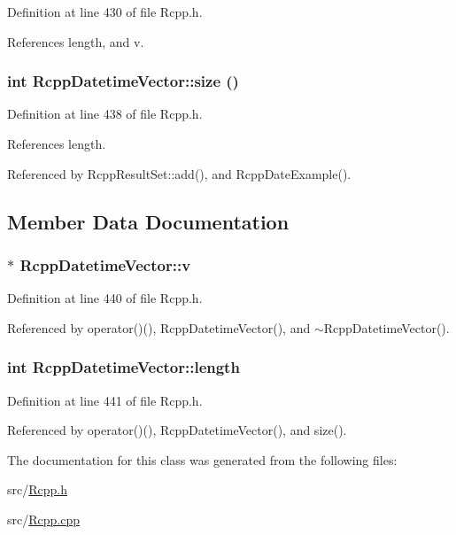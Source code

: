 Definition at line 430 of file Rcpp.h.

References length, and v.\hypertarget{classRcppDatetimeVector_8ca7268098fb2b9250523c4e2ef3c8b7}{
\subsubsection[size]{\setlength{\rightskip}{0pt plus 5cm}int RcppDatetimeVector::size ()}}
\label{classRcppDatetimeVector_8ca7268098fb2b9250523c4e2ef3c8b7}




Definition at line 438 of file Rcpp.h.

References length.

Referenced by RcppResultSet::add(), and RcppDateExample().

\subsection{Member Data Documentation}
\hypertarget{classRcppDatetimeVector_0138476000351892e9ec591b2c9ec02f}{
\subsubsection[v]{$\ast$ {\bf RcppDatetimeVector::v}}}
\label{classRcppDatetimeVector_0138476000351892e9ec591b2c9ec02f}




Definition at line 440 of file Rcpp.h.

Referenced by operator()(), RcppDatetimeVector(), and $\sim$RcppDatetimeVector().\hypertarget{classRcppDatetimeVector_e131031fcf2e65b7bfeee3d8e25c4f8c}{
\subsubsection[length]{\setlength{\rightskip}{0pt plus 5cm}int {\bf RcppDatetimeVector::length}}}
\label{classRcppDatetimeVector_e131031fcf2e65b7bfeee3d8e25c4f8c}




Definition at line 441 of file Rcpp.h.

Referenced by operator()(), RcppDatetimeVector(), and size().

The documentation for this class was generated from the following files:\begin{CompactItemize}
\item 
src/\hyperlink{Rcpp_8h}{Rcpp.h}\item 
src/\hyperlink{Rcpp_8cpp}{Rcpp.cpp}\end{CompactItemize}
